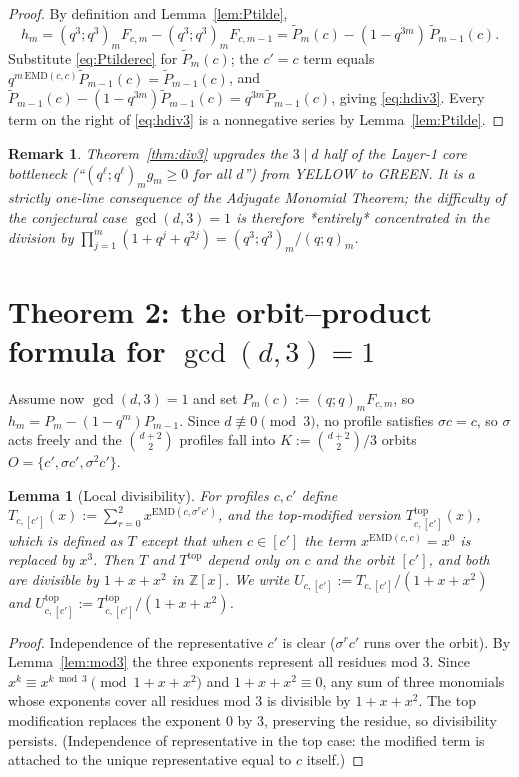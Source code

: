 \documentclass[11pt]{article}
\newtheorem{lemma}{Lemma}
\newtheorem{remark}{Remark}
\newcommand{\EMD}{\mathrm{EMD}}
\begin{document}
\begin{proof}
By definition and Lemma~\ref{lem:Ptilde},
\[
h_m = (q^3;q^3)_m F_{c,m} - (q^3;q^3)_m F_{c,m-1}
= \widetilde P_m(c) - (1-q^{3m})\,\widetilde P_{m-1}(c).
\]
Substitute \eqref{eq:Ptilderec} for $\widetilde P_m(c)$; the $c'=c$ term equals
$q^{m\,\EMD(c,c)}\widetilde P_{m-1}(c) = \widetilde P_{m-1}(c)$, and
$\widetilde P_{m-1}(c) - (1-q^{3m})\widetilde P_{m-1}(c) = q^{3m}\widetilde P_{m-1}(c)$,
giving \eqref{eq:hdiv3}. Every term on the right of \eqref{eq:hdiv3} is a nonnegative
series by Lemma~\ref{lem:Ptilde}.
\end{proof}

\begin{remark}
Theorem~\ref{thm:div3} upgrades the $3\mid d$ half of the Layer-1 core bottleneck
(``$(q^\ell;q^\ell)_m g_m \ge 0$ for all $d$'') from YELLOW to GREEN. It is a strictly
one-line consequence of the Adjugate Monomial Theorem; the difficulty of the conjectural
case $\gcd(d,3)=1$ is therefore *entirely* concentrated in the division by
$\prod_{j=1}^m (1+q^j+q^{2j}) = (q^3;q^3)_m/(q;q)_m$.
\end{remark}

\section{Theorem 2: the orbit--product formula for $\gcd(d,3)=1$}

Assume now $\gcd(d,3)=1$ and set $P_m(c) := (q;q)_m F_{c,m}$, so $h_m = P_m - (1-q^m)P_{m-1}$.
Since $d\not\equiv 0 \pmod 3$, no profile satisfies $\sigma c = c$, so $\sigma$ acts freely
and the $\binom{d+2}{2}$ profiles fall into $K := \binom{d+2}{2}/3$ orbits
$O = \{c',\sigma c',\sigma^2 c'\}$.

\begin{lemma}[Local divisibility]\label{lem:localdiv}
For profiles $c, c'$ define
$T_{c,[c']}(x) := \sum_{r=0}^{2} x^{\EMD(c,\sigma^r c')}$, and the top-modified version
$T^{\mathrm{top}}_{c,[c']}(x)$, which is defined as $T$ except that when $c \in [c']$
the term $x^{\EMD(c,c)} = x^0$ is replaced by $x^3$. Then $T$ and $T^{\mathrm{top}}$ depend
only on $c$ and the orbit $[c']$, and both are divisible by $1+x+x^2$ in $\mathbb{Z}[x]$.
We write $U_{c,[c']} := T_{c,[c']}/(1+x+x^2)$ and
$U^{\mathrm{top}}_{c,[c']} := T^{\mathrm{top}}_{c,[c']}/(1+x+x^2)$.
\end{lemma}

\begin{proof}
Independence of the representative $c'$ is clear ($\sigma^r c'$ runs over the orbit).
By Lemma~\ref{lem:mod3} the three exponents represent all residues mod 3.
Since $x^k \equiv x^{k \bmod 3} \pmod{1+x+x^2}$ and $1+x+x^2 \equiv 0$, any sum of three
monomials whose exponents cover all residues mod 3 is divisible by $1+x+x^2$. The top
modification replaces the exponent $0$ by $3$, preserving the residue, so divisibility
persists. (Independence of representative in the top case: the modified term is attached to
the unique representative equal to $c$ itself.)
\end{proof}
\end{document}
